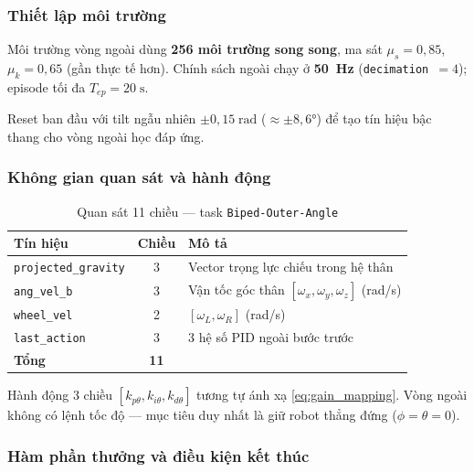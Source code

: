 \subsubsection{Thiết lập môi trường}

Môi trường vòng ngoài dùng \textbf{256 môi trường song song}, ma sát
$\mu_s = 0{,}85$, $\mu_k = 0{,}65$ (gần thực tế hơn). Chính sách ngoài
chạy ở \textbf{50~Hz} (\texttt{decimation}~$= 4$); episode tối đa
$T_{ep} = 20\;\text{s}$.

Reset ban đầu với tilt ngẫu nhiên $\pm 0{,}15\;\text{rad}$ ($\approx\pm8{,}6°$)
để tạo tín hiệu bậc thang cho vòng ngoài học đáp ứng.

\subsubsection{Không gian quan sát và hành động}

\begin{table}[H]
    \centering
    \caption{Quan sát 11 chiều — task \texttt{Biped-Outer-Angle}}
    \label{tab:obs_outer}
    \renewcommand{\arraystretch}{1.3}
    \begin{tabular}{|l|c|l|}
    \hline
    \textbf{Tín hiệu} & \textbf{Chiều} & \textbf{Mô tả} \\
    \hline
    \texttt{projected\_gravity} & 3 & Vector trọng lực chiếu trong hệ thân \\
    \texttt{ang\_vel\_b}        & 3 & Vận tốc góc thân $[\omega_x,\omega_y,\omega_z]$ (rad/s) \\
    \texttt{wheel\_vel}         & 2 & $[\omega_L, \omega_R]$ (rad/s) \\
    \texttt{last\_action}       & 3 & 3 hệ số PID ngoài bước trước \\
    \hline
    \textbf{Tổng}               & \textbf{11} & \\
    \hline
    \end{tabular}
\end{table}

Hành động 3 chiều $[k_{p\theta}, k_{i\theta}, k_{d\theta}]$ tương tự ánh xạ
\eqref{eq:gain_mapping}. Vòng ngoài không có lệnh tốc độ — mục tiêu duy nhất
là giữ robot thẳng đứng ($\phi = \theta = 0$).

\subsubsection{Hàm phần thưởng và điều kiện kết thúc}


